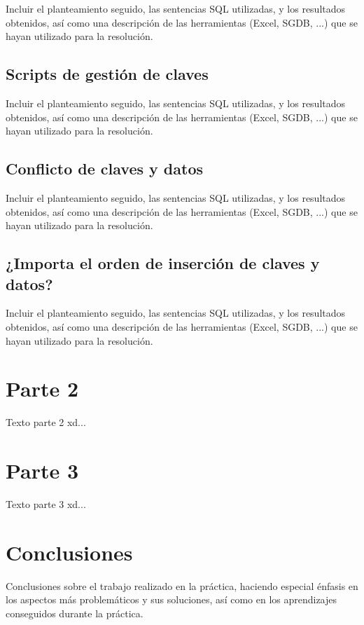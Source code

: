 \documentclass[a4paper, 11pt, oneside]{article} %
\begin{document}
Incluir el planteamiento seguido, las sentencias SQL utilizadas, y los resultados obtenidos, así como una descripción de las herramientas (Excel, SGDB, ...) que se hayan utilizado para la resolución.

\subsection{Scripts de gestión de claves}

Incluir el planteamiento seguido, las sentencias SQL utilizadas, y los resultados obtenidos, así como una descripción de las herramientas (Excel, SGDB, ...) que se hayan utilizado para la resolución.

\subsection{Conflicto de claves y datos}

Incluir el planteamiento seguido, las sentencias SQL utilizadas, y los resultados obtenidos, así como una descripción de las herramientas (Excel, SGDB, ...) que se hayan utilizado para la resolución.

\subsection{¿Importa el orden de inserción de claves y datos?}

Incluir el planteamiento seguido, las sentencias SQL utilizadas, y los resultados obtenidos, así como una descripción de las herramientas (Excel, SGDB, ...) que se hayan utilizado para la resolución.
	
\newpage


\section{Parte 2}

Texto parte 2 xd...
	
\newpage


\section{Parte 3}

Texto parte 3 xd...

\newpage


\section{Conclusiones}

Conclusiones sobre el trabajo realizado en la práctica, haciendo especial énfasis en los aspectos más problemáticos y sus soluciones, así como en los aprendizajes conseguidos durante la práctica.
\end{document}
